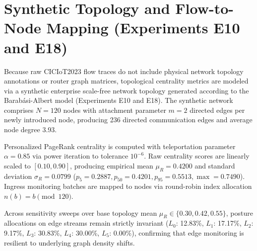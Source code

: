 \section{Synthetic Topology and Flow-to-Node Mapping (Experiments E10 and E18)}
\label{app:topology}

Because raw CICIoT2023 flow traces do not include physical network topology annotations or router graph matrices, topological centrality metrics are modeled via a synthetic enterprise scale-free network topology generated according to the Barab\'asi-Albert model (Experiments E10 and E18). The synthetic network comprises $N = 120$ nodes with attachment parameter $m = 2$ directed edges per newly introduced node, producing 236 directed communication edges and average node degree 3.93.

Personalized PageRank centrality is computed with teleportation parameter $\alpha = 0.85$ via power iteration to tolerance $10^{-6}$. Raw centrality scores are linearly scaled to $[0.10, 0.90]$, producing empirical mean $\mu_R = 0.4200$ and standard deviation $\sigma_R = 0.0799$ ($p_5 = 0.2887, p_{50} = 0.4201, p_{95} = 0.5513, \max = 0.7490$). Ingress monitoring batches are mapped to nodes via round-robin index allocation $n(b) = b \pmod{120}$. 

Across sensitivity sweeps over base topology mean $\mu_R \in \{0.30, 0.42, 0.55\}$, posture allocations on edge streams remain strictly invariant ($L_0$: 12.83\%, $L_1$: 17.17\%, $L_2$: 9.17\%, $L_3$: 30.83\%, $L_4$: 30.00\%, $L_5$: 0.00\%), confirming that edge monitoring is resilient to underlying graph density shifts.
